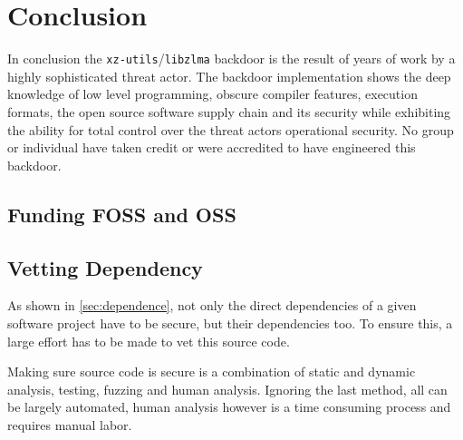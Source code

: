 \section{Conclusion}

In conclusion the \texttt{xz-utils}/\texttt{libzlma} backdoor is the result of
years of work by a highly sophisticated threat actor. The backdoor
implementation shows the deep knowledge of low level programming, obscure
compiler features, execution formats, the open source software supply chain and
its security while exhibiting the ability for total control over the threat
actors operational security. No group or individual have taken credit or were
accredited to have engineered this backdoor.

\subsection{Funding FOSS and OSS}
\subsection{Vetting Dependency}

As shown in \autoref{sec:dependence}, not only the direct dependencies of a
given software project have to be secure, but their dependencies too. To ensure
this, a large effort has to be made to vet this source code.

Making sure source code is secure is a combination of static and dynamic
analysis, testing, fuzzing and human analysis. Ignoring the last method, all
can be largely automated, human analysis however is a time consuming process
and requires manual labor.
